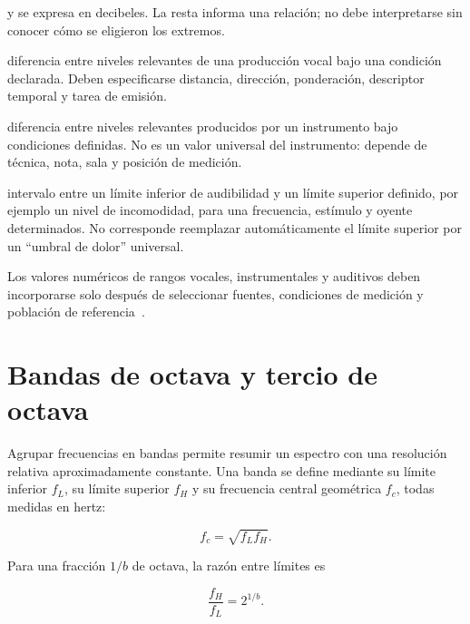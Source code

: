 y se expresa en decibeles. La resta informa una relación; no debe interpretarse
sin conocer cómo se eligieron los extremos.

\begin{description}[style=nextline]
    \item[\textbf{Rango dinámico vocal:}]
    diferencia entre niveles relevantes de una producción vocal bajo una
    condición declarada. Deben especificarse distancia, dirección,
    ponderación, descriptor temporal y tarea de emisión.

    \item[\textbf{Rango dinámico instrumental:}]
    diferencia entre niveles relevantes producidos por un instrumento bajo
    condiciones definidas. No es un valor universal del instrumento: depende
    de técnica, nota, sala y posición de medición.

    \item[\textbf{Rango dinámico auditivo:}]
    intervalo entre un límite inferior de audibilidad y un límite superior
    definido, por ejemplo un nivel de incomodidad, para una frecuencia,
    estímulo y oyente determinados. No corresponde reemplazar automáticamente
    el límite superior por un ``umbral de dolor'' universal.
\end{description}

Los valores numéricos de rangos vocales, instrumentales y auditivos
deben incorporarse solo después de seleccionar fuentes, condiciones de
medición y población de referencia~\cite{oxenham2018,iso226_2023}.

\section{Bandas de octava y tercio de octava}
\label{sec:u5-bandas}

Agrupar frecuencias en bandas permite resumir un espectro con una resolución
relativa aproximadamente constante. Una banda se define mediante su límite
inferior \(f_L\), su límite superior \(f_H\) y su frecuencia central
geométrica \(f_c\), todas medidas en hertz:

\begin{equation}
    f_c=\sqrt{f_Lf_H}.
    \label{eq:u5-centro-geometrico}
\end{equation}

Para una fracción \(1/b\) de octava, la razón entre límites es

\begin{equation}
    \frac{f_H}{f_L}=2^{1/b}.
    \label{eq:u5-razon-banda}
\end{equation}


